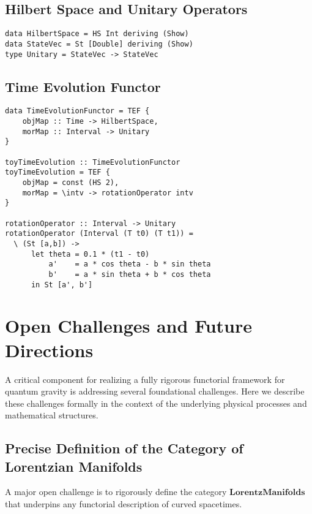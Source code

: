 \documentclass[12pt]{article}
\begin{document}
\subsection{Hilbert Space and Unitary Operators}
\begin{lstlisting}[caption={Hilbert space abstraction and state representation}]
data HilbertSpace = HS Int deriving (Show)
data StateVec = St [Double] deriving (Show)
type Unitary = StateVec -> StateVec
\end{lstlisting}

\subsection{Time Evolution Functor}
\begin{lstlisting}[caption={Defining a functor for time evolution}]
data TimeEvolutionFunctor = TEF {
    objMap :: Time -> HilbertSpace,
    morMap :: Interval -> Unitary
}

toyTimeEvolution :: TimeEvolutionFunctor
toyTimeEvolution = TEF {
    objMap = const (HS 2),
    morMap = \intv -> rotationOperator intv
}

rotationOperator :: Interval -> Unitary
rotationOperator (Interval (T t0) (T t1)) =
  \ (St [a,b]) ->
      let theta = 0.1 * (t1 - t0)
          a'    = a * cos theta - b * sin theta
          b'    = a * sin theta + b * cos theta
      in St [a', b']
\end{lstlisting}

\section{Open Challenges and Future Directions}
A critical component for realizing a fully rigorous functorial framework for quantum gravity is addressing several foundational challenges. Here we describe these challenges formally in the context of the underlying physical processes and mathematical structures.

\subsection{Precise Definition of the Category of Lorentzian Manifolds}
A major open challenge is to rigorously define the category \(\mathbf{LorentzManifolds}\) that underpins any functorial description of curved spacetimes.
\end{document}
